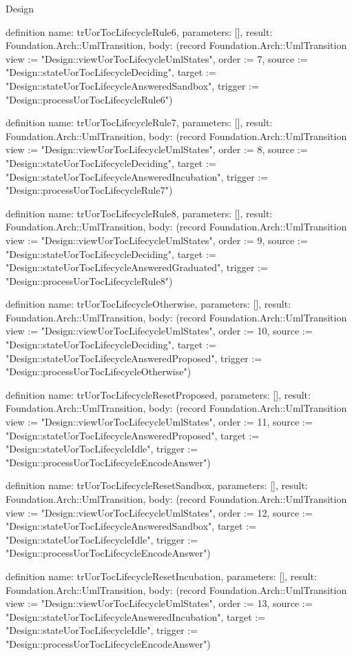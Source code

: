 \begin{lexlean}{Design}
\begin{semanticmodule}
definition{
  name: trUorTocLifecycleRule6,
  parameters: [],
  result: Foundation.Arch::UmlTransition,
  body: (record Foundation.Arch::UmlTransition {view := "Design::viewUorTocLifecycleUmlStates", order := 7, source := "Design::stateUorTocLifecycleDeciding", target := "Design::stateUorTocLifecycleAnsweredSandbox", trigger := "Design::processUorTocLifecycleRule6"})
}

definition{
  name: trUorTocLifecycleRule7,
  parameters: [],
  result: Foundation.Arch::UmlTransition,
  body: (record Foundation.Arch::UmlTransition {view := "Design::viewUorTocLifecycleUmlStates", order := 8, source := "Design::stateUorTocLifecycleDeciding", target := "Design::stateUorTocLifecycleAnsweredIncubation", trigger := "Design::processUorTocLifecycleRule7"})
}

definition{
  name: trUorTocLifecycleRule8,
  parameters: [],
  result: Foundation.Arch::UmlTransition,
  body: (record Foundation.Arch::UmlTransition {view := "Design::viewUorTocLifecycleUmlStates", order := 9, source := "Design::stateUorTocLifecycleDeciding", target := "Design::stateUorTocLifecycleAnsweredGraduated", trigger := "Design::processUorTocLifecycleRule8"})
}

definition{
  name: trUorTocLifecycleOtherwise,
  parameters: [],
  result: Foundation.Arch::UmlTransition,
  body: (record Foundation.Arch::UmlTransition {view := "Design::viewUorTocLifecycleUmlStates", order := 10, source := "Design::stateUorTocLifecycleDeciding", target := "Design::stateUorTocLifecycleAnsweredProposed", trigger := "Design::processUorTocLifecycleOtherwise"})
}

definition{
  name: trUorTocLifecycleResetProposed,
  parameters: [],
  result: Foundation.Arch::UmlTransition,
  body: (record Foundation.Arch::UmlTransition {view := "Design::viewUorTocLifecycleUmlStates", order := 11, source := "Design::stateUorTocLifecycleAnsweredProposed", target := "Design::stateUorTocLifecycleIdle", trigger := "Design::processUorTocLifecycleEncodeAnswer"})
}

definition{
  name: trUorTocLifecycleResetSandbox,
  parameters: [],
  result: Foundation.Arch::UmlTransition,
  body: (record Foundation.Arch::UmlTransition {view := "Design::viewUorTocLifecycleUmlStates", order := 12, source := "Design::stateUorTocLifecycleAnsweredSandbox", target := "Design::stateUorTocLifecycleIdle", trigger := "Design::processUorTocLifecycleEncodeAnswer"})
}

definition{
  name: trUorTocLifecycleResetIncubation,
  parameters: [],
  result: Foundation.Arch::UmlTransition,
  body: (record Foundation.Arch::UmlTransition {view := "Design::viewUorTocLifecycleUmlStates", order := 13, source := "Design::stateUorTocLifecycleAnsweredIncubation", target := "Design::stateUorTocLifecycleIdle", trigger := "Design::processUorTocLifecycleEncodeAnswer"})
}


\end{semanticmodule}
\end{lexlean}
